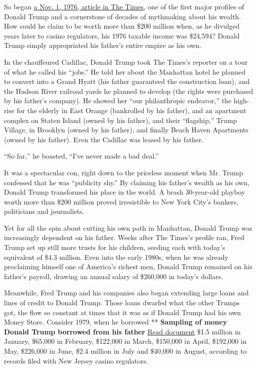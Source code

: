 So began
\href{https://www.nytimes3xbfgragh.onion/1976/11/01/archives/donald-trump-real-estate-promoter-builds-image-as-he-buys-buildings.html}{a
Nov. 1, 1976, article in The Times,} one of the first major profiles of
Donald Trump and a cornerstone of decades of mythmaking about his
wealth. How could he claim to be worth more than \$200 million when, as
he divulged years later to casino regulators, his 1976 taxable income
was \$24,594? Donald Trump simply appropriated his father's entire
empire as his own.

In the chauffeured Cadillac, Donald Trump took The Times's reporter on a
tour of what he called his ``jobs.'' He told her about the Manhattan
hotel he planned to convert into a Grand Hyatt (his father guaranteed
the construction loan), and the Hudson River railroad yards he planned
to develop (the rights were purchased by his father's company). He
showed her ``our philanthropic endeavor,'' the high-rise for the elderly
in East Orange (bankrolled by his father), and an apartment complex on
Staten Island (owned by his father), and their ``flagship,'' Trump
Village, in Brooklyn (owned by his father), and finally Beach Haven
Apartments (owned by his father). Even the Cadillac was leased by his
father.

``So far,'' he boasted, ``I've never made a bad deal.''

It was a spectacular con, right down to the priceless moment when Mr.
Trump confessed that he was ``publicity shy.'' By claiming his father's
wealth as his own, Donald Trump transformed his place in the world. A
brash 30-year-old playboy worth more than \$200 million proved
irresistible to New York City's bankers, politicians and journalists.

Yet for all the spin about cutting his own path in Manhattan, Donald
Trump was increasingly dependent on his father. Weeks after The Times's
profile ran, Fred Trump set up still more trusts for his children,
seeding each with today's equivalent of \$4.3 million. Even into the
early 1980s, when he was already proclaiming himself one of America's
richest men, Donald Trump remained on his father's payroll, drawing an
annual salary of \$260,000 in today's dollars.

Meanwhile, Fred Trump and his companies also began extending large loans
and lines of credit to Donald Trump. Those loans dwarfed what the other
Trumps got, the flow so constant at times that it was as if Donald Trump
had his own Money Store. Consider 1979, when he borrowed **
\textbf{Sampling of money Donald Trump borrowed from his father}
\href{https://int.graylady3jvrrxbe.onion/data/documenthelper/188-djt-borrowings-1979/0e4bc1daf254d4c19ed5/optimized/full.pdf\#page=1}{Read
document} \$1.5 million in January, \$65,000 in February, \$122,000 in
March, \$150,000 in April, \$192,000 in May, \$226,000 in June, \$2.4
million in July and \$40,000 in August, according to records filed with
New Jersey casino regulators.

